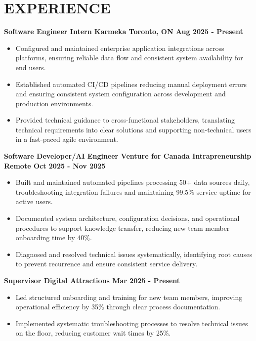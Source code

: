 \documentclass[11pt]{article}
\begin{document}
\section*{EXPERIENCE}
\textbf{Software Engineer Intern \textbar{} Karmeka \textbar{} Toronto, ON \textbar{} Aug 2025 - Present}
\begin{itemize}[ leftmargin=1.5em,  topsep=0pt,itemsep=0pt, parsep=0pt]
\item    Configured and maintained enterprise application integrations across platforms, ensuring reliable data flow and consistent system availability for end users.
\item    Established automated CI/CD pipelines reducing manual deployment errors and ensuring consistent system configuration across development and production environments.
\item    Provided technical guidance to cross-functional stakeholders, translating technical requirements into clear solutions and supporting non-technical users in a fast-paced agile environment.

\end{itemize}
\textbf{Software Developer/AI Engineer \textbar{} Venture for Canada Intrapreneurship \textbar{} Remote \textbar{} Oct 2025 - Nov 2025}
\begin{itemize}[ leftmargin=1.5em,  topsep=0pt,itemsep=0pt, parsep=0pt]
\item    Built and maintained automated pipelines processing 50+ data sources daily, troubleshooting integration failures and maintaining 99.5\% service uptime for active users.
\item    Documented system architecture, configuration decisions, and operational procedures to support knowledge transfer, reducing new team member onboarding time by 40\%.
\item    Diagnosed and resolved technical issues systematically, identifying root causes to prevent recurrence and ensure consistent service delivery.

\end{itemize}
\textbf{Supervisor \textbar{} Digital Attractions \textbar{} Mar 2025 - Present}
\begin{itemize}[leftmargin=1.5em, topsep=0pt,itemsep=0pt, parsep=0pt]
\item    Led structured onboarding and training for new team members, improving operational efficiency by 35\% through clear process documentation.
\item    Implemented systematic troubleshooting processes to resolve technical issues on the floor, reducing customer wait times by 25\%.

\end{itemize}
\end{document}
